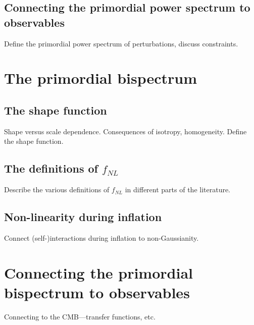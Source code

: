     \subsection{Connecting the primordial power spectrum to observables}
    Define the primordial power spectrum of perturbations, discuss constraints.
\newpage
\section{The primordial bispectrum}
    \subsection{The shape function}
    Shape versus scale dependence.
    Consequences of isotropy, homogeneity.
    Define the shape function.
    \newpage
    \subsection{The definitions of $f_{NL}$}
    Describe the various definitions of $f_{NL}$ in different
    parts of the literature.
    \newpage
    \subsection{Non-linearity during inflation}
    Connect (self-)interactions during inflation to non-Gaussianity.
    \newpage
\section{Connecting the primordial bispectrum to observables}
    Connecting to the CMB---transfer functions, etc.
\newpage
